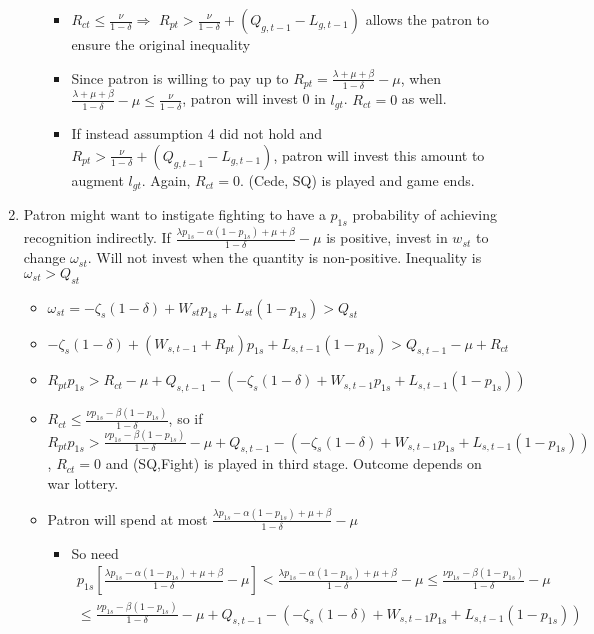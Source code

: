 \documentclass[12pt]{article}
\newcommand{\de}{\delta}
\begin{document}
\begin{enumerate}
\begin{itemize}
				\begin{itemize}
					\item $R_{ct} \leq \frac{\nu}{1-\de} \Rightarrow$ $R_{pt} > \frac{\nu}{1-\de} + \left( Q_{g,t-1} - L_{g,t-1}\right)$ allows the patron to ensure the original inequality
					\item Since patron is willing to pay up to $R_{pt} = \frac{\lambda +\mu + \beta}{1-\de} - \mu$, when $\frac{\lambda +\mu + \beta}{1-\de} -\mu \leq \frac{\nu}{1-\de}$, patron will invest 0 in $l_{gt}$. $R_{ct} = 0$ as well.
					\item If instead assumption 4 did not hold and $R_{pt} > \frac{\nu}{1-\de} + \left( Q_{g,t-1} - L_{g,t-1}\right)$, patron will invest this amount to augment $l_{gt}$. Again, $R_{ct} = 0$. (Cede, SQ) is played and game ends.
				\end{itemize}
		\end{itemize}
	\item Patron might want to instigate fighting to have a $p_{1s}$ probability of achieving recognition indirectly. If $\frac{\lambda p_{1s} - \alpha (1-p_{1s}) + \mu + \beta}{1 - \de} -\mu$ is positive, invest in $w_{st}$ to change $\omega_{st}$. Will not invest when the quantity is non-positive. Inequality is $\omega_{st} > Q_{st}$
		\begin{itemize}
			\item $\omega_{st} = -\zeta_{s}(1-\de) + W_{st}p_{1s} + L_{st}(1-p_{1s}) > Q_{st}$
			\item $-\zeta_{s}(1-\de) + (W_{s,t-1}+R_{pt})p_{1s} + L_{s,t-1}(1-p_{1s}) > Q_{s,t-1} - \mu + R_{ct}$
			\item $R_{pt}p_{1s} > R_{ct} - \mu + Q_{s,t-1} - \left(-\zeta_{s}(1-\de) + W_{s,t-1}p_{1s} + L_{s,t-1}(1-p_{1s})\right)$
			\item $R_{ct} \leq \frac{\nu p_{1s} - \beta (1-p_{1s})}{1 -\de}$, so if $R_{pt}p_{1s} > \frac{\nu p_{1s} - \beta (1-p_{1s})}{1 -\de} - \mu + Q_{s,t-1} - \left(-\zeta_{s}(1-\de) + W_{s,t-1}p_{1s} + L_{s,t-1}(1-p_{1s})\right)$, $R_{ct}=0$ and (SQ,Fight) is played in third stage. Outcome depends on war lottery.
			\item Patron will spend at most $\frac{\lambda p_{1s} - \alpha (1-p_{1s}) +\mu + \beta}{1 -\de} - \mu$
				\begin{itemize}
					\item So need
						\begin{multline}
							\textstyle p_{1s}\left[\frac{\lambda p_{1s} - \alpha (1-p_{1s}) +\mu + \beta}{1 -\de} - \mu\right] < \frac{\lambda p_{1s} - \alpha (1-p_{1s}) +\mu + \beta}{1 -\de} - \mu \leq \frac{\nu p_{1s} - \beta (1-p_{1s})}{1 -\de} - \mu \\ \leq \frac{\nu p_{1s} - \beta (1-p_{1s})}{1 -\de} - \mu + Q_{s,t-1} - \left(-\zeta_{s}(1-\de) + W_{s,t-1}p_{1s} + L_{s,t-1}(1-p_{1s})\right)

\end{multline}
\end{itemize}
\end{itemize}
\end{enumerate}
\end{document}
